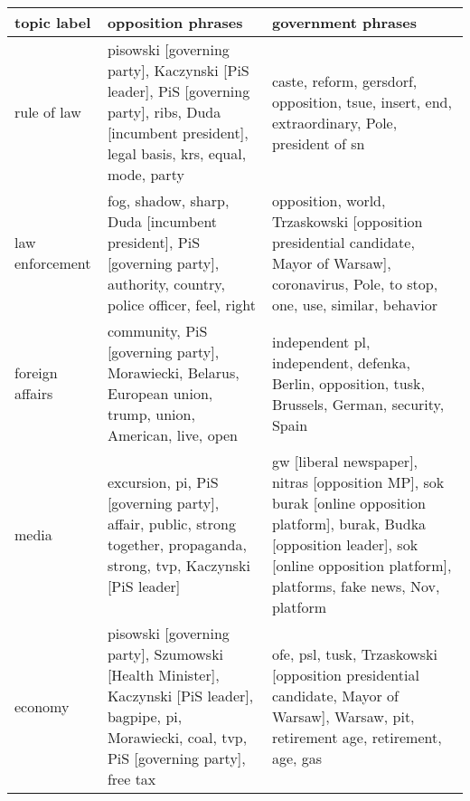 \begin{tabular}{p{2cm}p{6cm}p{6cm}}
\toprule
             topic label &                                                                                                                                                                opposition phrases &                                                                                                                                                                               government phrases \\
\midrule
             rule of law &                                 pisowski [governing party], Kaczynski [PiS leader], PiS [governing party], ribs, Duda [incumbent president], legal basis, krs, equal, mode, party &                                                                                                     caste, reform, gersdorf, opposition, tsue, insert, end, extraordinary, Pole, president of sn \\
         law enforcement &                                                            fog, shadow, sharp, Duda [incumbent president], PiS [governing party], authority, country, police officer, feel, right &                                                     opposition, world, Trzaskowski [opposition presidential candidate, Mayor of Warsaw], coronavirus, Pole, to stop, one, use, similar, behavior \\
         foreign affairs &                                                                         community, PiS [governing party], Morawiecki, Belarus, European union, trump, union, American, live, open &                                                                                                independent pl, independent, defenka, Berlin, opposition, tusk, Brussels, German, security, Spain \\
                   media &                                                            excursion, pi, PiS [governing party], affair, public, strong together, propaganda, strong, tvp, Kaczynski [PiS leader] &  gw [liberal newspaper], nitras [opposition MP], sok burak [online opposition platform], burak, Budka [opposition leader], sok [online opposition platform], platforms, fake news, Nov, platform \\
                 economy &                              pisowski [governing party], Szumowski [Health Minister], Kaczynski [PiS leader], bagpipe, pi, Morawiecki, coal, tvp, PiS [governing party], free tax &                                                              ofe, psl, tusk, Trzaskowski [opposition presidential candidate, Mayor of Warsaw], Warsaw, pit, retirement age, retirement, age, gas \\

\end{tabular}
